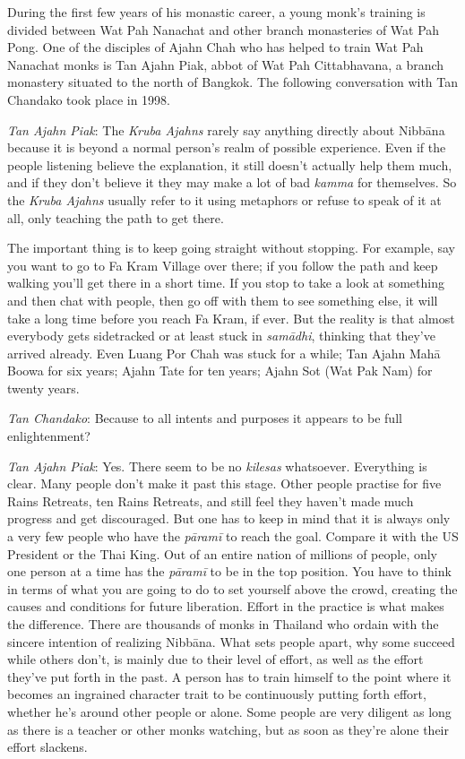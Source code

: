 
During the first few years of his monastic career, a young monk's
training is divided between Wat Pah Nanachat and other branch
monasteries of Wat Pah Pong. One of the disciples of Ajahn Chah who has
helped to train Wat Pah Nanachat monks is Tan Ajahn Piak, abbot of Wat
Pah Cittabhavana, a branch monastery situated to the north of Bangkok. 
The following conversation with Tan Chandako took place in 1998. 

\emph{Tan Ajahn Piak}: The \emph{Kruba Ajahns} rarely say anything
directly about Nibbāna because it is beyond a normal person's realm of
possible experience. Even if the people listening believe the
explanation, it still doesn't actually help them much, and if they don't
believe it they may make a lot of bad \emph{kamma} for themselves. So
the \emph{Kruba Ajahns} usually refer to it using metaphors or refuse
to speak of it at all, only teaching the path to get there. 

The important thing is to keep going straight without stopping. For
example, say you want to go to Fa Kram Village over there; if you follow
the path and keep walking you'll get there in a short time. If you stop
to take a look at something and then chat with people, then go off with
them to see something else, it will take a long time before you reach Fa
Kram, if ever. But the reality is that almost everybody gets sidetracked
or at least stuck in \emph{samādhi}, thinking that they've arrived
already. Even Luang Por Chah was stuck for a while; Tan Ajahn Mahā Boowa
for six years; Ajahn Tate for ten years; Ajahn Sot (Wat Pak Nam) for
twenty years. 

\emph{Tan Chandako}: Because to all intents and purposes it appears to
be full enlightenment? 

\emph{Tan Ajahn Piak}: Yes. There seem to be no \emph{kilesas}
whatsoever. Everything is clear. Many people don't make it past this
stage. Other people practise for five Rains Retreats, ten Rains
Retreats, and still feel they haven't made much progress and get
discouraged. But one has to keep in mind that it is always only a very
few people who have the \emph{pāramī} to reach the goal. Compare it with
the US President or the Thai King. Out of an entire nation of millions
of people, only one person at a time has the \emph{pāramī} to be in the
top position. You have to think in terms of what you are going to do to
set yourself above the crowd, creating the causes and conditions for
future liberation. Effort in the practice is what makes the difference. 
There are thousands of monks in Thailand who ordain with the sincere
intention of realizing Nibbāna. What sets people apart, why some succeed
while others don't, is mainly due to their level of effort, as well as
the effort they've put forth in the past. A person has to train himself
to the point where it becomes an ingrained character trait to be
continuously putting forth effort, whether he's around other people or
alone. Some people are very diligent as long as there is a teacher or
other monks watching, but as soon as they're alone their effort
slackens. 

